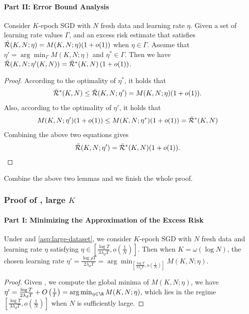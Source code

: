 \paragraph{Part II: Error Bound Analysis}
\begin{lemma} \label{lem:error-bound-analysis}
    Consider $K$-epoch SGD with $N$ fresh data and learning rate $\eta$. Given a set of learning rate values $\Gamma$, and an excess risk estimate that satisfies $\Bar{\mathcal{R}}(K, N;\eta) = M(K, N;\eta)(1+ o(1))$ when $\eta \in \Gamma$. Assume that $\eta' = \arg\min_{\Gamma}M(K, N;\eta)$ and $\eta^* \in \Gamma$. Then we have $\Bar{\mathcal{R}}(K,N;\eta'(K,N)) = \Bar{\mathcal{R}}^*(K,N)\left(1 + o(1)\right)$.
\end{lemma}
\begin{proof}
    According to the optimality of $\eta^*$, it holds that
    \begin{align*}
        \bar{\mathcal{R}}^*(K,N) \le \bar{\mathcal{R}}(K,N;\eta') = M(K,N;\eta)(1 +o(1)).
    \end{align*}
    Also, according to the optimality of $\eta'$, it holds that
    \begin{align*}
        M(K,N;\eta')(1 + o(1)) \le M(K,N;\eta^*)(1 +o(1)) = \bar{\mathcal{R}}^*(K,N)
    \end{align*}
    Combining the above two equations gives
    \begin{align*}
        \bar{\mathcal{R}}(K,N;\eta') = \bar{\mathcal{R}}^*(K,N)(1 +o(1)).
    \end{align*}
\end{proof}
Combine the above two lemmas and we finish the whole proof.
\subsubsection{Proof of , large $K$}


\paragraph{Part I: Minimizing the Approximation of the Excess Risk}
\begin{lemma}\label{lem:approx-convex-opt-lr}
    Under  and \ref{asp:large-dataset}, we consider $K$-epoch SGD with $N$ fresh data and learning rate $\eta$ satisfying $\eta \in [\frac{\log T}{3\lambda_d T}, o\left(\frac{1}{N}\right)]$. Then when $K=\omega\left(\log N\right)$, the chosen learning rate  $\eta' = \frac{\log  \rho T}{2\lambda_d T} = \arg\min_{[\frac{\log T}{3\lambda_d T}, o\left(\frac{1}{N}\right)]}M(K, N;\eta)$.
\end{lemma}
\begin{proof}
    Given , we compute the global minima of $M(K, N;\eta)$, we have $\eta' = \frac{\log T}{2\lambda_d T}+O\left(\frac{1}{T}\right)=\arg\min_{\eta \in \R}M(K, N;\eta)$, which lies in the regime $[\frac{\log T}{3\lambda_d T}, o\left(\frac{1}{N}\right)]$ when $N$ is sufficiently large.
\end{proof}

